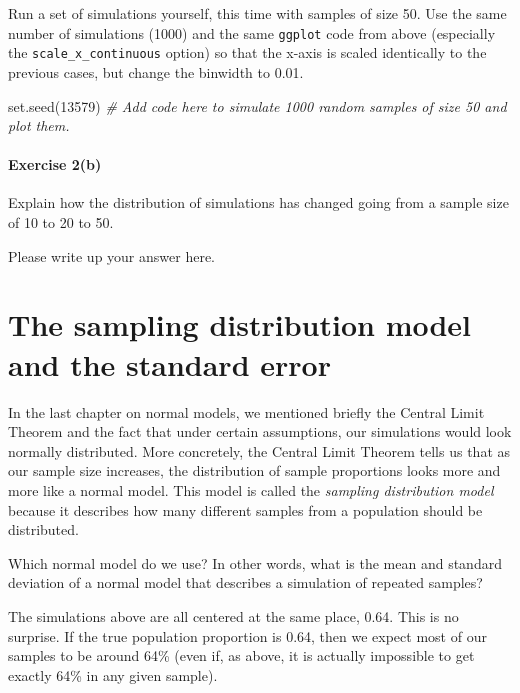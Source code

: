 \documentclass[
]{book}
\newenvironment{Shaded}{\begin{snugshade}}{\end{snugshade}}
\newcommand{\CommentTok}[1]{\textcolor[rgb]{0.56,0.35,0.01}{\textit{#1}}}
\newcommand{\DecValTok}[1]{\textcolor[rgb]{0.00,0.00,0.81}{#1}}
\newcommand{\FunctionTok}[1]{\textcolor[rgb]{0.00,0.00,0.00}{#1}}
\newcommand{\NormalTok}[1]{#1}
\begin{document}
Run a set of simulations yourself, this time with samples of size 50. Use the same number of simulations (1000) and the same \texttt{ggplot} code from above (especially the \texttt{scale\_x\_continuous} option) so that the x-axis is scaled identically to the previous cases, but change the binwidth to 0.01.

\begin{Shaded}
\begin{Highlighting}[]
\FunctionTok{set.seed}\NormalTok{(}\DecValTok{13579}\NormalTok{)}
\CommentTok{\# Add code here to simulate 1000 random samples of size 50 and plot them.}
\end{Highlighting}
\end{Shaded}

\hypertarget{exercise-2b-3}{%
\paragraph*{Exercise 2(b)}\label{exercise-2b-3}}

Explain how the distribution of simulations has changed going from a sample size of 10 to 20 to 50.

Please write up your answer here.

\hypertarget{samp-dist-models-se}{%
\section{The sampling distribution model and the standard error}\label{samp-dist-models-se}}

In the last chapter on normal models, we mentioned briefly the Central Limit Theorem and the fact that under certain assumptions, our simulations would look normally distributed. More concretely, the Central Limit Theorem tells us that as our sample size increases, the distribution of sample proportions looks more and more like a normal model. This model is called the \emph{sampling distribution model} because it describes how many different samples from a population should be distributed.

Which normal model do we use? In other words, what is the mean and standard deviation of a normal model that describes a simulation of repeated samples?

The simulations above are all centered at the same place, 0.64. This is no surprise. If the true population proportion is 0.64, then we expect most of our samples to be around 64\% (even if, as above, it is actually impossible to get exactly 64\% in any given sample).
\end{document}
